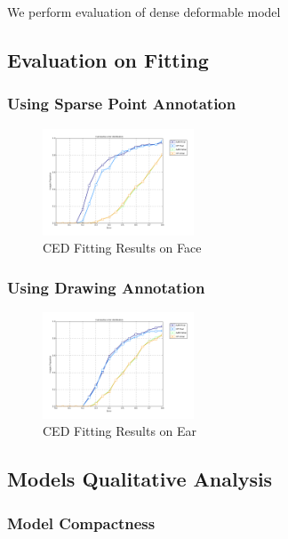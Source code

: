 We perform evaluation of dense deformable model

\subsection{Evaluation on Fitting}

\subsubsection{Using Sparse Point Annotation}
\begin{figure}[h!]
    \centering
    \includegraphics[width=0.4\textwidth]{resources/face_digo_mc}
    \caption{CED Fitting Results on Face}
\end{figure}

\subsubsection{Using Drawing Annotation}
\begin{figure}[h!]
    \centering
    \includegraphics[width=0.4\textwidth]{resources/ear_digo_mc}
    \caption{CED Fitting Results on Ear}
\end{figure}

\subsection{Models Qualitative Analysis}

\subsubsection{Model Compactness}

